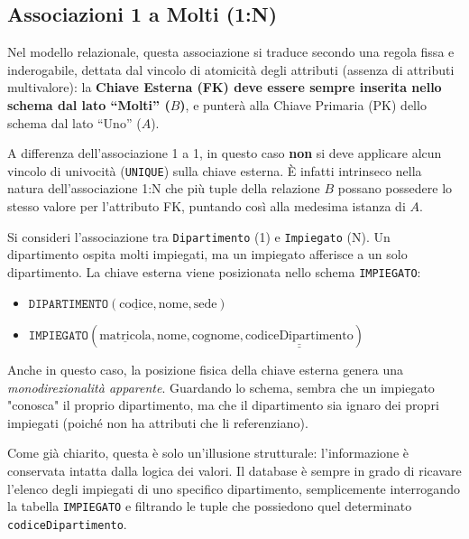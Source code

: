 \subsection{Associazioni 1 a Molti (1:N)}

Nel modello relazionale, questa associazione si traduce secondo una regola fissa e inderogabile, dettata dal vincolo di atomicità degli attributi (assenza di attributi multivalore): la \textbf{Chiave Esterna (FK) deve essere sempre inserita nello schema dal lato ``Molti'' ($B$)}, e punterà alla Chiave Primaria (PK) dello schema dal lato ``Uno'' ($A$).

A differenza dell'associazione 1 a 1, in questo caso \textbf{non} si deve applicare alcun vincolo di univocità (\texttt{UNIQUE}) sulla chiave esterna. È infatti intrinseco nella natura dell'associazione 1:N che più tuple della relazione $B$ possano possedere lo stesso valore per l'attributo FK, puntando così alla medesima istanza di $A$.

\begin{example}
Si consideri l'associazione tra \texttt{Dipartimento} (1) e \texttt{Impiegato} (N). Un dipartimento ospita molti impiegati, ma un impiegato afferisce a un solo dipartimento.
La chiave esterna viene posizionata nello schema \texttt{IMPIEGATO}:

\begin{itemize}
    \item $\texttt{DIPARTIMENTO}(\underline{\text{codice}}, \text{nome}, \text{sede})$
    \item $\texttt{IMPIEGATO}(\underline{\text{matricola}}, \text{nome}, \text{cognome}, \underline{\underline{\text{codiceDipartimento}}})$
\end{itemize}
\end{example}

\begin{observation}
Anche in questo caso, la posizione fisica della chiave esterna genera una \textit{monodirezionalità apparente}. Guardando lo schema, sembra che un impiegato "conosca" il proprio dipartimento, ma che il dipartimento sia ignaro dei propri impiegati (poiché non ha attributi che li referenziano). 

Come già chiarito, questa è solo un'illusione strutturale: l'informazione è conservata intatta dalla logica dei valori. Il database è sempre in grado di ricavare l'elenco degli impiegati di uno specifico dipartimento, semplicemente interrogando la tabella \texttt{IMPIEGATO} e filtrando le tuple che possiedono quel determinato \texttt{codiceDipartimento}.
\end{observation}

